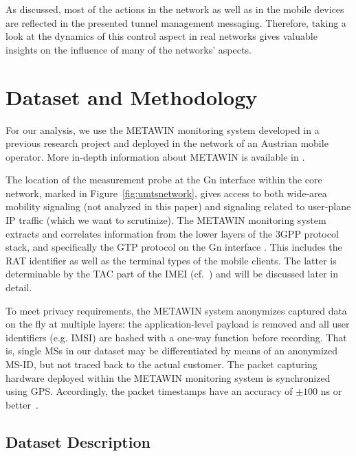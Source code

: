 As discussed, most of the actions in the network as well as in the mobile devices are reflected in the presented tunnel management messaging. Therefore, taking a look at the dynamics of this control aspect in real networks gives valuable insights on the influence of many of the networks' aspects.


\section{Dataset and Methodology}
\label{sec:darwin-IMC}

For our analysis, we use the \ac{METAWIN} monitoring system developed in a previous research project and deployed in the network of an Austrian mobile operator.  More in-depth information about \ac{METAWIN} is available in \cite{ricciato_2011}.

 The location of the measurement probe at the Gn interface within the core network, marked in Figure~\ref{fig:umtsnetwork}, gives access to both wide-area mobility signaling (not analyzed in this paper) and signaling related to user-plane IP traffic (which we want to scrutinize). The \ac{METAWIN} monitoring system extracts and correlates information from the lower layers of the \ac{3GPP} protocol stack, and specifically the \ac{GTP} protocol on the Gn interface \cite{etsi_3gpp_2008}. This includes the \acf{RAT} identifier as well as the terminal types of the mobile clients. The latter is determinable by the \acf{TAC} part of the \acf{IMEI} (cf.~\cite{3gpp23003}) and will be discussed later in detail.

To meet privacy requirements, the \ac{METAWIN} system anonymizes captured data on the fly at multiple layers: the application-level payload is removed and all user identifiers (e.g. \ac{IMSI}) are hashed with a one-way function before recording. That is, single \acp{MS} in our dataset may be differentiated by means of an anonymized \ac{MS-ID}, but not traced back to the actual customer. The packet capturing hardware deployed within the \ac{METAWIN} monitoring system is synchronized using \ac{GPS}. Accordingly, the packet timestamps have an accuracy of $\pm100$ ns or better~\cite[p.97-98]{donnelly_high_2002}.

\subsection{Dataset Description}

